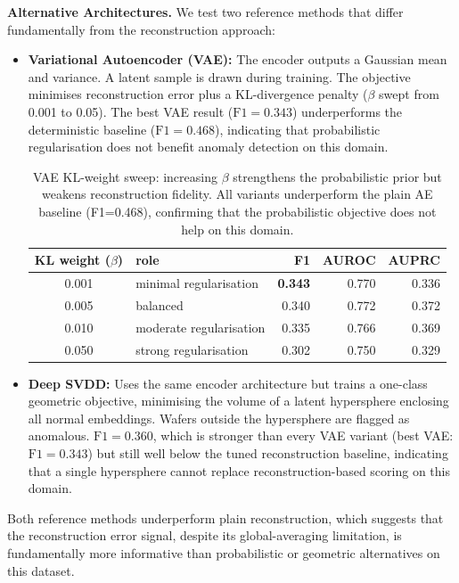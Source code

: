 \documentclass[11pt]{article}
\begin{document}
\textbf{Alternative Architectures.} We test two reference methods that differ fundamentally from the reconstruction approach:

\begin{itemize}[leftmargin=1.5em]
  \item \textbf{Variational Autoencoder (VAE):} The encoder outputs a Gaussian mean and variance. A latent sample is drawn during training. The objective minimises reconstruction error plus a KL-divergence penalty ($\beta$ swept from 0.001 to 0.05). The best VAE result ($\mathrm{F1}=0.343$) underperforms the deterministic baseline ($\mathrm{F1}=0.468$), indicating that probabilistic regularisation does not benefit anomaly detection on this domain.

  \begin{table}[H]
  \centering
  \small
  \begin{tabularx}{\linewidth}{c X r r r}
  \toprule
  \textbf{KL weight} ($\beta$) & \textbf{role} & \textbf{F1} & \textbf{AUROC} & \textbf{AUPRC} \\
  \midrule
  0.001 & minimal regularisation & \textbf{0.343} & 0.770 & 0.336 \\
  0.005 & balanced & 0.340 & 0.772 & 0.372 \\
  0.010 & moderate regularisation & 0.335 & 0.766 & 0.369 \\
  0.050 & strong regularisation & 0.302 & 0.750 & 0.329 \\
  \bottomrule
  \end{tabularx}
  \caption{VAE KL-weight sweep: increasing $\beta$ strengthens the probabilistic prior but weakens reconstruction fidelity. All variants underperform the plain AE baseline (F1=0.468), confirming that the probabilistic objective does not help on this domain.}
  \label{tab:vae_beta_sweep}
  \end{table}

  \item \textbf{Deep SVDD:} Uses the same encoder architecture but trains a one-class geometric objective, minimising the volume of a latent hypersphere enclosing all normal embeddings. Wafers outside the hypersphere are flagged as anomalous. $\mathrm{F1}=0.360$, which is stronger than every VAE variant (best VAE: $\mathrm{F1}=0.343$) but still well below the tuned reconstruction baseline, indicating that a single hypersphere cannot replace reconstruction-based scoring on this domain.
\end{itemize}

Both reference methods underperform plain reconstruction, which suggests that the reconstruction error signal, despite its global-averaging limitation, is fundamentally more informative than probabilistic or geometric alternatives on this dataset.
\end{document}
